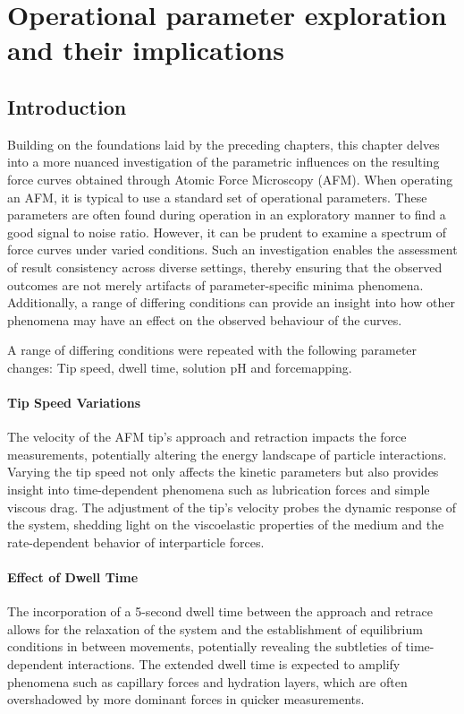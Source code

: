 \chapter{Operational parameter exploration and their implications}

\section{Introduction}

Building on the foundations laid by the preceding chapters, this chapter delves into a more nuanced investigation of the parametric influences on the resulting force curves obtained through Atomic Force Microscopy (AFM). When operating an AFM, it is typical to use a standard set of operational parameters. \cite{Schirmeisen2007} These parameters are often found during operation in an exploratory manner to find a good signal to noise ratio. However, it can be prudent  to examine a spectrum of force curves under varied conditions. Such an investigation enables the assessment of result consistency across diverse settings, thereby ensuring that the observed outcomes are not merely artifacts of parameter-specific minima phenomena. Additionally, a range of differing conditions can provide an insight into how other phenomena may have an effect on the observed behaviour of the curves.

A range of differing conditions were repeated with the following parameter changes: Tip speed, dwell time, solution pH and forcemapping. 

\subsubsection{Tip Speed Variations}
The velocity of the AFM tip's approach and retraction impacts the force measurements, potentially altering the energy landscape of particle interactions. Varying the tip speed not only affects the kinetic parameters but also provides insight into time-dependent phenomena such as lubrication forces and simple viscous drag. The adjustment of the tip's velocity probes the dynamic response of the system, shedding light on the viscoelastic properties of the medium and the rate-dependent behavior of interparticle forces.

\subsubsection{Effect of Dwell Time}

The incorporation of a 5-second dwell time between the approach and retrace allows for the relaxation of the system and the establishment of equilibrium conditions in between movements, potentially revealing the subtleties of time-dependent interactions. The extended dwell time is expected to amplify phenomena such as capillary forces and hydration layers, which are often overshadowed by more dominant forces in quicker measurements.

